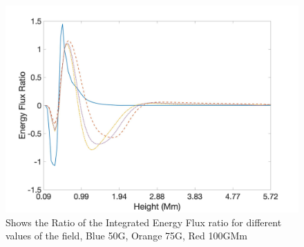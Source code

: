 \documentclass[linenumbers]{aastex63}
\begin{document}
\begin{figure}
    \label{energyfluxratio_50G_75G_100G_line}
    \centering
    \includegraphics[scale=0.2]{energyfluxratio.jpg}
    \caption{Shows the Ratio of the Integrated Energy Flux ratio for different values of the field, Blue 50G, Orange 75G, Red 100GMm}
\end{figure}
\end{document}
